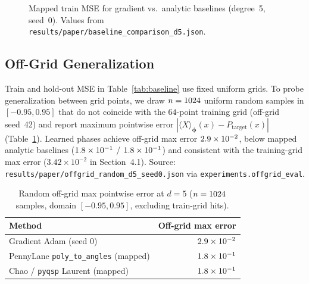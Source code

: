 \documentclass[11pt,a4paper]{article}
\begin{document}
\begin{figure}[ht]
\centering
{}
\caption{Mapped train MSE for gradient vs.\ analytic baselines (degree~5, seed~0). Values from \texttt{results/paper/baseline\_comparison\_d5.json}.}
\label{fig:baseline}
\end{figure}

\subsection{Off-Grid Generalization}
\label{sec:offgrid}

Train and hold-out MSE in Table~\ref{tab:baseline} use fixed uniform grids. To probe generalization between grid points, we draw $n=1024$ uniform random samples in $[-0.95,0.95]$ that do not coincide with the $64$-point training grid (off-grid seed~42) and report maximum pointwise error $| \langle X\rangle_{\boldsymbol{\phi}}(x) - P_{\mathrm{target}}(x) |$ (Table~\ref{tab:offgrid}). Learned phases achieve off-grid max error $2.9\times10^{-2}$, below mapped analytic baselines ($1.8\times10^{-1}$ / $1.8\times10^{-1}$) and consistent with the training-grid max error ($3.42\times10^{-2}$ in Section~4.1). Source: \texttt{results/paper/offgrid\_random\_d5\_seed0.json} via \texttt{experiments.offgrid\_eval}.

\begin{table}[ht]
\centering\small
\begin{tabular}{@{} l r @{}}
  \toprule
  \textbf{Method} & \textbf{Off-grid max error} \\
  \midrule
  Gradient Adam (seed 0) & $2.9\times10^{-2}$ \\
  PennyLane \texttt{poly\_to\_angles} (mapped) & $1.8\times10^{-1}$ \\
  Chao / \texttt{pyqsp} Laurent (mapped) & $1.8\times10^{-1}$ \\
  \bottomrule
\end{tabular}
\caption{Random off-grid max pointwise error at $d=5$ ($n=1024$ samples, domain $[-0.95,0.95]$, excluding train-grid hits).}
\label{tab:offgrid}
\end{table}
\end{document}
